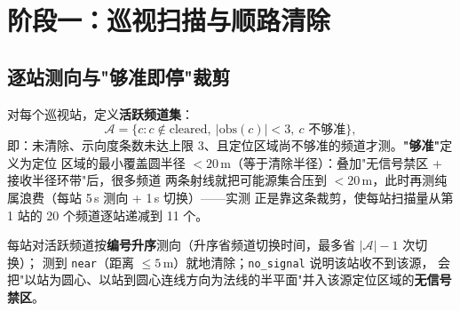 \documentclass[a4paper,11pt]{ctexart}
\begin{document}
\section{阶段一：巡视扫描与顺路清除}
\subsection{逐站测向与"够准即停"裁剪}
对每个巡视站，定义\textbf{活跃频道集}：
\begin{equation}
  \mathcal{A} = \bigl\{c : c\notin\text{cleared},\ |\text{obs}(c)|<3,\ c\text{ 不够准}\bigr\},
  \label{eq:active}
\end{equation}
即：未清除、示向度条数未达上限 $3$、且定位区域尚不够准的频道才测。\textbf{"够准"}定义为定位
区域的最小覆盖圆半径 $<20$\,m（等于清除半径）：叠加"无信号禁区 + 接收半径环带"后，很多频道
两条射线就把可能源集合压到 $<20$\,m，此时再测纯属浪费（每站 5\,s 测向 + 1\,s 切换）——实测
正是靠这条裁剪，使每站扫描量从第 1 站的 20 个频道逐站递减到 11 个。

每站对活跃频道按\textbf{编号升序}测向（升序省频道切换时间，最多省 $|\mathcal{A}|-1$ 次切换）；
测到 \texttt{near}（距离 $\le 5$\,m）就地清除；\texttt{no\_signal} 说明该站收不到该源，
会把"以站为圆心、以站到圆心连线方向为法线的半平面"并入该源定位区域的\textbf{无信号禁区}。
\end{document}
